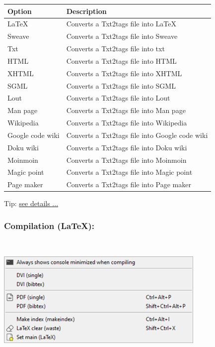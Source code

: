 \begin{scriptsize}
  \begin{tabularx}{\textwidth}{>{\hsize=0.3\hsize}X>{\hsize=0.7\hsize}X}\\
    \hline
    \textbf{Option} & \textbf{Description} \\
    \hline
    \LaTeX & Converts a Txt2tags file into \LaTeX \\
    Sweave & Converts a Txt2tags file into Sweave \\
    Txt & Converts a Txt2tags file into txt \\
    \hdashline[1pt/1pt]
    HTML & Converts a Txt2tags file into HTML \\
    XHTML & Converts a Txt2tags file into XHTML \\
    SGML & Converts a Txt2tags file into SGML \\
    Lout & Converts a Txt2tags file into Lout \\
    Man page & Converts a Txt2tags file into Man page \\
    \hdashline[1pt/1pt]
    Wikipedia & Converts a Txt2tags file into Wikipedia \\
    Google code wiki & Converts a Txt2tags file into Google code wiki \\
    Doku wiki & Converts a Txt2tags file into Doku wiki \\
    Moinmoin & Converts a Txt2tags file into Moinmoin \\
    \hdashline[1pt/1pt]
    Magic point & Converts a Txt2tags file into Magic point \\
    Page maker & Converts a Txt2tags file into Page maker \\
    \hline
  \end{tabularx}
\end{scriptsize}

Tip: \href{http://txt2tags.sourceforge.net/}{see details ...}


\hypertarget{menu_tools_processing_conversion_compilation}{}
\subsubsection{Compilation (\LaTeX):}\\

\includegraphics[scale=0.8]{./res/menu_tools_processing_compilation.png}\\

